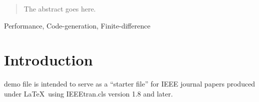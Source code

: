 \documentclass[journal]{IEEEtran}
\begin{document}




\maketitle

\begin{abstract}
The abstract goes here.
\end{abstract}

\begin{IEEEkeywords}
Performance, Code-generation, Finite-difference
\end{IEEEkeywords}



%
\IEEEpeerreviewmaketitle



\section{Introduction}
% 
% 
% 
% 
 demo file is intended to serve as a ``starter file''
for IEEE journal papers produced under \LaTeX\ using
IEEEtran.cls version 1.8 and later.
\end{document}
